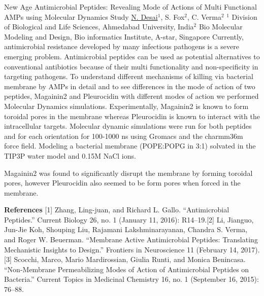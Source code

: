 
    \begin{abstract_online}{New Age Antimicrobial Peptides: Revealing Mode of Actions of Multi Functional AMPs using Molecular Dynamics Study}{%
        \underline{N. Desai}$^{1}$, S. Fox$^{2}$, C. Verma$^{2}$}{%
        }{%
        $^1$ Division of Biological and Life Sciences, Ahmedabad University, India\newline{}$^2$ Bio Molecular Modeling and Design, Bio informatics Institute, A-star, Singapore}
    Currently, antimicrobial resistance developed by many infectious pathogens is a severe emerging problem. Antimicrobial peptides can be used as potential alternatives to conventional antibiotics because of their multi functionality and non-specificity in targeting pathogens. To understand different mechanisms of killing via bacterial membrane by AMPs in detail and to see differences in the mode of action of two peptides, Magainin2 and Pleurocidin with different modes of action we performed Molecular Dynamics simulations. Experimentally, Magainin2 is known to form toroidal pores in the membrane whereas Pleurocidin is known to interact with the intracellular targets. Molecular dynamic simulations were run for both peptides and for each orientation for 100-1000 ns using Gromacs and the charmm36m force field. Modeling a bacterial membrane (POPE:POPG in 3:1) solvated in the TIP3P water model and 0.15M NaCl ions. \par Magainin2 was found to significantly disrupt the membrane by forming toroidal pores, however Pleurocidin also seemed to be form pores when forced in the membrane. 
    
        \textbf{References} \newline{}[1] Zhang, Ling-juan, and Richard L. Gallo. “Antimicrobial Peptides.” Current Biology 26, no. 1 (January 11, 2016): R14–19.\newline{}[2] Li, Jianguo, Jun-Jie Koh, Shouping Liu, Rajamani Lakshminarayanan, Chandra S. Verma, and Roger W. Beuerman. “Membrane Active Antimicrobial Peptides: Translating Mechanistic Insights to Design.” Frontiers in Neuroscience 11 (February 14, 2017).\newline{}[3] Scocchi, Marco, Mario Mardirossian, Giulia Runti, and Monica Benincasa. “Non-Membrane Permeabilizing Modes of Action of Antimicrobial Peptides on Bacteria.” Current Topics in Medicinal Chemistry 16, no. 1 (September 16, 2015): 76–88.
    \end{abstract_online}
    